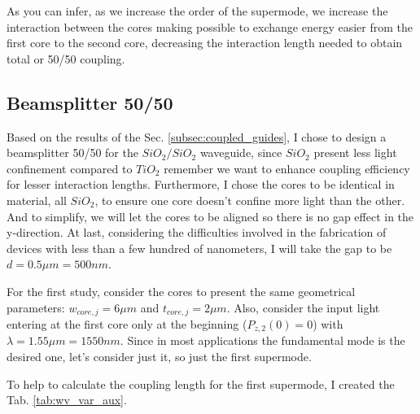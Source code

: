 \documentclass[a4paper,12pt]{article}
\begin{document}
As you can infer, as we increase the order of the supermode, we increase the interaction between the cores making possible to exchange energy easier from the first core to the second core, decreasing the interaction length needed to obtain total or 50/50 coupling.

\subsection{Beamsplitter 50/50}
\label{subsec:beamsplitter}

Based on the results of the Sec. \ref{subsec:coupled_guides}, I chose to design a beamsplitter 50/50 for the $SiO_2/SiO_2$ waveguide, since $SiO_2$ present less light confinement compared to $TiO_2$ \textemdash remember we want to enhance coupling efficiency for lesser interaction lengths. Furthermore, I chose the cores to be identical in material, all $SiO_2$, to ensure one core doesn't confine more light than the other. And to simplify, we will let the cores to be aligned so there is no gap effect in the y-direction. At last, considering the difficulties involved in the fabrication of devices with less than a few hundred of nanometers, I will take the gap to be $d = 0.5\mu m = 500nm$.

For the first study, consider the cores to present the same geometrical parameters: $w_{core, j} = 6\mu m$ and $t_{core, j} = 2\mu m$. Also, consider the input light entering at the first core only at the beginning ($P_{z,2}(0) = 0$) with $\lambda = 1.55\mu m = 1550nm$. Since in most applications the fundamental mode is the desired one, let's consider just it, so just the first supermode.

To help to calculate the coupling length for the first supermode, I created the Tab. \ref{tab:wv_var_aux}.
\end{document}
